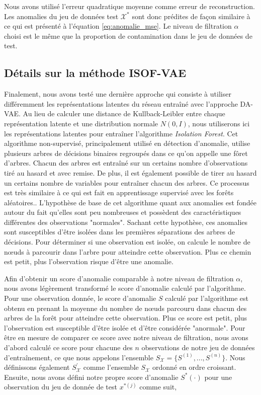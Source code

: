 Nous avons utilisé l'erreur quadratique moyenne comme erreur de reconstruction. Les anomalies du jeu de données test $\mathcal{X^*}$ sont donc prédites de façon similaire à ce qui est présenté à l'équation \ref{eq:anomalie_mse}. Le niveau de filtration $\alpha$ choisi est le même que la proportion de contamination dans le jeu de données de test.

\subsection{Détails sur la méthode ISOF-VAE} \label{isof_vae}

Finalement, nous avons testé une dernière approche qui consiste à utiliser différemment les représentations latentes du réseau entraîné avec l'approche DA-VAE. Au lieu de calculer une distance de Kullback-Leibler entre chaque représentation latente et une distribution normale $N(0,I)$, nous utiliserons ici les représentations latentes pour entraîner l'algorithme \textit{Isolation Forest}. Cet algorithme non-supervisé, principalement utilisé en détection d'anomalie, utilise plusieurs arbres de décisions binaires regroupés dans ce qu'on appelle une fôret d'arbres. Chacun des arbres est entraîné sur un certains nombre d'observations tiré au hasard et avec remise. De plus, il est également possible de tirer au hasard un certains nombre de variables pour entraîner chacun des arbres. Ce processus est très similaire à ce qui est fait en apprentissage supervisé avec les forêts aléatoires.\citep{Statistics01randomforests}. L'hypothèse de base de cet algorithme quant aux anomalies est fondée autour du fait qu'elles sont peu nombreuses et possèdent des caractéristiques différentes des observations "normales". Sachant cette hypothèse, ces anomalies sont susceptibles d'être isolées dans les premières séparations des arbres de décisions. Pour déterminer si une observation est isolée, on calcule le nombre de nœuds à parcourir dans l'arbre pour atteindre cette observation. Plus ce chemin est petit, plus l'observation risque d'être une anomalie.

Afin d'obtenir un score d'anomalie comparable à notre niveau de filtration $\alpha$, nous avons légèrement transformé le score d'anomalie calculé par l'algorithme. Pour une observation donnée, le score d'anomalie $S$  calculé par l'algorithme est obtenu en prenant la moyenne du nombre de nœuds parcouru dans chacun des arbres de la forêt pour atteindre cette observation. Plus ce score est petit, plus l'observation est susceptible d'être isolée et d'être considérée "anormale". Pour être en mesure de comparer ce score avec notre niveau de filtration, nous avons d'abord calculé ce score pour chacune des $n$ observations de notre jeu de données d'entraînement, ce que nous appelons l'ensemble $S_{\mathcal{X}} = \{S^{(1)}, ..., S^{(n)}\}$. Nous définissons également $S^{'}_{\mathcal{X}}$ comme l'ensemble $S_{\mathcal{X}}$ ordonné en ordre croissant.  Ensuite, nous avons défini notre propre score d'anomalie $S^*(\cdot)$ pour une observation du jeu de donnée de test $x^{*(j)}$ comme suit,

